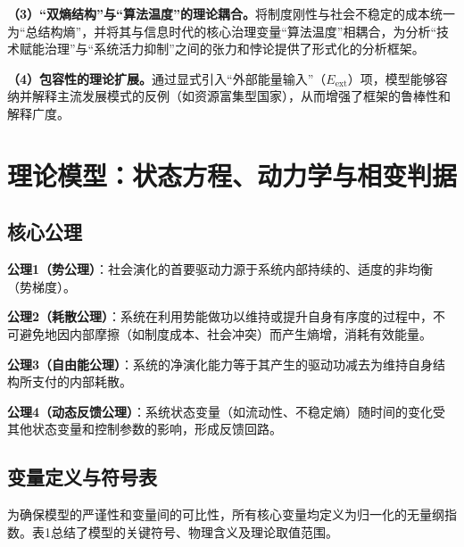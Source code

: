 \documentclass[twocolumn]{ctexart}
\newcommand{\Eext}{E_{\mathrm{ext}}}
\begin{document}
\textbf{（3）“双熵结构”与“算法温度”的理论耦合。}将制度刚性与社会不稳定的成本统一为“总结构熵”，并将其与信息时代的核心治理变量“算法温度”相耦合，为分析“技术赋能治理”与“系统活力抑制”之间的张力和悖论提供了形式化的分析框架。

\textbf{（4）包容性的理论扩展。}通过显式引入“外部能量输入”（$\Eext$）项，模型能够容纳并解释主流发展模式的反例（如资源富集型国家），从而增强了框架的鲁棒性和解释广度。

\section{理论模型：状态方程、动力学与相变判据}

\subsection{核心公理}

\textbf{公理1（势公理）}：社会演化的首要驱动力源于系统内部持续的、适度的非均衡（势梯度）。

\textbf{公理2（耗散公理）}：系统在利用势能做功以维持或提升自身有序度的过程中，不可避免地因内部摩擦（如制度成本、社会冲突）而产生熵增，消耗有效能量。

\textbf{公理3（自由能公理）}：系统的净演化能力等于其产生的驱动功减去为维持自身结构所支付的内部耗散。

\textbf{公理4（动态反馈公理）}：系统状态变量（如流动性、不稳定熵）随时间的变化受其他状态变量和控制参数的影响，形成反馈回路。

\subsection{变量定义与符号表}

为确保模型的严谨性和变量间的可比性，所有核心变量均定义为归一化的无量纲指数。表1总结了模型的关键符号、物理含义及理论取值范围。
\end{document}
